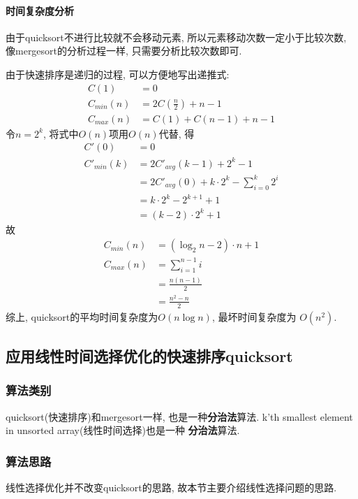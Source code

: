 \paragraph{时间复杂度分析}
\label{par:quicksortTime}
由于quicksort不进行比较就不会移动元素, 所以元素移动次数一定小于比较次数,
像mergesort的分析过程一样, 只需要分析比较次数即可.\par
由于快速排序是递归的过程, 可以方便地写出递推式:
\begin{align}
	C(1)       & = 0                        \nonumber \\
	C_{min}(n) & = 2C(\frac{n}{2}) + n - 1  \nonumber \\
	C_{max}(n) & = C(1) + C(n - 1) + n - 1  \nonumber
\end{align}
令\(n=2^k\), 将式中$O(n)$项用$O(n)$代替, 得
\begin{align}
	C'(0)       & = 0                                           \nonumber \\
	C'_{min}(k) & = 2C'_{avg}(k-1)+2^k-1                        \nonumber \\
	            & = 2C'_{avg}(0)+k\cdot 2^k - \sum_{i=0}^k 2^i  \nonumber \\
	            & = k\cdot 2^k - 2^{k+1}+1                      \nonumber \\
	            & = (k-2)\cdot 2^k + 1 \nonumber
\end{align}
故
\begin{align}
	C_{min}(n) & = (\log_2{n}-2)\cdot n+1  \nonumber \\
	C_{max}(n) & = \sum_{i=1}^{n-1}i       \nonumber \\
	           & = \frac{n(n-1)}{2}        \nonumber \\
	           & =\frac{n^2-n}{2}          \nonumber
\end{align}
综上, quicksort的平均时间复杂度为$O(n\log n)$, 最坏时间复杂度为
$O(n^2)$.

\subsection{应用线性时间选择优化的快速排序quicksort}
\subsubsection{算法类别}
quicksort(快速排序)和mergesort一样, 也是一种\textbf{分治法}算法.
k'th smallest element in unsorted array(线性时间选择)也是一种
\textbf{分治法}算法.

\subsubsection{算法思路}
线性选择优化并不改变quicksort的思路, 故本节主要介绍线性选择问题的思路.

